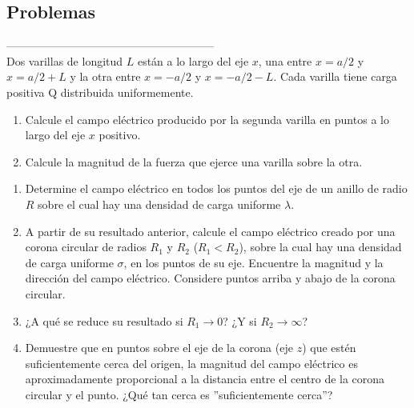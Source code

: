 \subsection{Problemas}
--------------------------------------------------------
\\

\np
Dos varillas de longitud $L$ están a lo largo del eje $x$, una entre $x=a/2$ y $x=a/2+L$ y la otra entre $x=-a/2$ y $x=-a/2-L$. Cada varilla tiene carga positiva Q distribuida uniformemente.

\begin{enumerate}[label=\alph*)]
    \item Calcule el campo eléctrico producido por la segunda varilla en puntos a lo largo del eje $x$ positivo.
    \item Calcule la magnitud de la fuerza que ejerce una varilla sobre la otra.
\end{enumerate}

\np
\begin{enumerate}[label=\alph*)]
    \item Determine el campo eléctrico en todos los puntos del eje de un anillo de radio $R$ sobre el cual hay una densidad de carga uniforme $\lambda$.
    \item A partir de su resultado anterior, calcule el campo eléctrico creado por una corona circular de radios $R_1$ y $R_2$ ($R_1 < R_2$), sobre la cual hay una densidad de carga uniforme $\sigma$, en los puntos de su eje. Encuentre la magnitud y la dirección del campo eléctrico. Considere puntos arriba y abajo de la corona circular.
    \item ¿A qué se reduce su resultado si $R_1 \longrightarrow 0$? ¿Y si $R_2 \longrightarrow \infty$?
    \item Demuestre que en puntos sobre el eje de la corona (eje $z$) que estén suficientemente cerca del origen, la magnitud del campo eléctrico es aproximadamente proporcional a la distancia entre el centro de la corona circular y el punto. ¿Qué tan cerca es ”suficientemente cerca”?
\end{enumerate}

